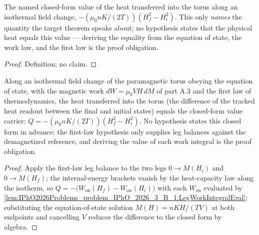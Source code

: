 \begin{definition}
\label{def:IPhO2026Problems_problem_IPhO_2026_3_B_1:HeatIntoTorusValue}
The named closed-form value of the heat transferred into the torus along an
isothermal field change, $-(\mu_0 n K/(2T))(H_f^2 - H_i^2)$.  This only
\emph{names} the quantity the target theorem speaks about; no hypothesis
states that the physical heat equals this value --- deriving the equality
from the equation of state, the work law, and the first law is the proof
obligation.
\end{definition}
\begin{proof}
Definition; no claim.
\end{proof}

\begin{theorem}
\label{thm:IPhO2026Problems_problem_IPhO_2026_3_B_1:IsothermalHeatIntoTorus}
Along an isothermal field change of the paramagnetic torus obeying the
equation of state, with the magnetic work $dW = \mu_0 V H\,dM$ of part A.3
and the first law of thermodynamics, the heat transferred into the torus
(the difference of the tracked heat readout between the final and initial
states) equals the closed-form value carrier:
$Q = -(\mu_0 n K/(2T))(H_f^2 - H_i^2)$.  No hypothesis states this closed
form in advance: the first-law hypothesis only supplies leg balances
against the demagnetized reference, and deriving the value of each work
integral is the proof obligation.
\end{theorem}
\begin{proof}
Apply the first-law leg balance to the two legs $0 \to M(H_i)$ and
$0 \to M(H_f)$; the internal-energy brackets vanish by the heat-capacity
law along the isotherm, so
$Q = -\bigl(W_{\mathrm{on}}(H_f) - W_{\mathrm{on}}(H_i)\bigr)$ with each
$W_{\mathrm{on}}$ evaluated by
\cref{lem:IPhO2026Problems_problem_IPhO_2026_3_B_1:LegWorkIntegralEval};
substituting the equation-of-state solution
$M(H) = n K H /(T V)$ at both endpoints and cancelling $V$ reduces the
difference to the closed form by algebra.
\end{proof}

